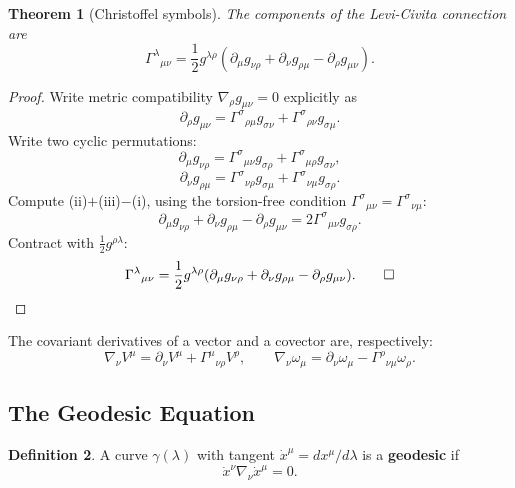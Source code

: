 \documentclass[12pt,a4paper]{article}
\theoremstyle{plain}
\newtheorem{theorem}{Theorem}[section]
\theoremstyle{definition}
\newtheorem{definition}[theorem]{Definition}
\theoremstyle{remark}
\begin{document}
\begin{theorem}[Christoffel symbols]\label{thm:christoffel}
The components of the Levi-Civita connection are
\[
  \Gamma^\lambda{}_{\mu\nu}
  = \frac{1}{2}g^{\lambda\rho}\!\left(\partial_\mu g_{\nu\rho} + \partial_\nu g_{\rho\mu} - \partial_\rho g_{\mu\nu}\right).
\]
\end{theorem}
\begin{proof}
Write metric compatibility $\nabla_\rho g_{\mu\nu}=0$ explicitly as
\[
  \partial_\rho g_{\mu\nu} = \Gamma^\sigma{}_{\rho\mu}g_{\sigma\nu} + \Gamma^\sigma{}_{\rho\nu}g_{\sigma\mu}. \tag{i}
\]
Write two cyclic permutations:
\[
  \partial_\mu g_{\nu\rho} = \Gamma^\sigma{}_{\mu\nu}g_{\sigma\rho} + \Gamma^\sigma{}_{\mu\rho}g_{\sigma\nu}, \tag{ii}
\]
\[
  \partial_\nu g_{\rho\mu} = \Gamma^\sigma{}_{\nu\rho}g_{\sigma\mu} + \Gamma^\sigma{}_{\nu\mu}g_{\sigma\rho}. \tag{iii}
\]
Compute (ii)$+$(iii)$-$(i), using the torsion-free condition $\Gamma^\sigma{}_{\mu\nu}=\Gamma^\sigma{}_{\nu\mu}$:
\[
  \partial_\mu g_{\nu\rho}+\partial_\nu g_{\rho\mu}-\partial_\rho g_{\mu\nu}
  = 2\Gamma^\sigma{}_{\mu\nu}g_{\sigma\rho}.
\]
Contract with $\tfrac{1}{2}g^{\rho\lambda}$:
\[
  \Gamma^\lambda{}_{\mu\nu} = \frac{1}{2}g^{\lambda\rho}(\partial_\mu g_{\nu\rho}+\partial_\nu g_{\rho\mu}-\partial_\rho g_{\mu\nu}). \qed
\]
\end{proof}

The covariant derivatives of a vector and a covector are, respectively:
\[
  \nabla_\nu V^\mu = \partial_\nu V^\mu + \Gamma^\mu{}_{\nu\rho}V^\rho,
  \qquad
  \nabla_\nu\omega_\mu = \partial_\nu\omega_\mu - \Gamma^\rho{}_{\nu\mu}\omega_\rho.
\]

\subsection{The Geodesic Equation}

\begin{definition}
A curve $\gamma(\lambda)$ with tangent $\dot x^\mu = dx^\mu/d\lambda$ is a \textbf{geodesic} if
\[
  \dot x^\nu\nabla_\nu\dot x^\mu = 0.
\]
\end{definition}
\end{document}
